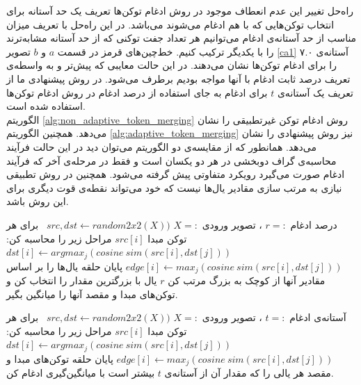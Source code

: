 راه‌حل تغییر این عدم انعطاف موجود در روش ادغام توکن‌ها تعریف یک حد آستانه برای انتخاب توکن‌هایی که با هم ادغام می‌شوند می‌باشد. در این راه‌حل با تعریف میزان مناسب از حد آستانه‌ی ادغام می‌توانیم هر تعداد جفت توکنی که از حد آستانه مشابه‌ترند را با یکدیگر ترکیب کنیم. خط‌چین‌های قرمز در قسمت $a$ و $b$ تصویر \ref{ca1} آستانه‌ی ۷.۰ را برای ادغام توکن‌ها نشان می‌دهند. در این حالت معایبی که پیش‌تر و به واسطه‌ی تعریف درصد ثابت ادغام با آنها مواجه بودیم برطرف می‌شود. در روش پیشنهادی ما از تعریف یک آستانه‌ی $t$ برای ادغام به جای استفاده از درصد ادغام در روش ادغام توکن‌ها استفاده شده است.
\\
الگوریتم \ref{alg:non_adaptive_token_merging} روش ادغام توکن غیرتطبیقی را نشان می‌دهد. همچنین الگوریتم \ref{alg:adaptive_token_merging} نیز روش پیشنهادی را نشان می‌دهد. همانطور که از مقایسه‌ی دو الگوریتم می‌توان دید در این حالت فرآیند محاسبه‌ی گراف دوبخشی در هر دو یکسان است و فقط در مرحله‌ی آخر که فرآیند ادغام صورت می‌گیرد رویکرد متفاوتی پیش گرفته می‌شود. همچنین در روش تطبیقی نیازی به مرتب سازی مقادیر یال‌ها نیست که خود می‌تواند نقطه‌ی قوت دیگری برای این روش باشد.


\begin{algorithm}[H]
	\caption{روش ادغام توکن غیرتطبیقی}
	\label{alg:non_adaptive_token_merging}
	\begin{algorithmic}[1]
		\State درصد ادغام $r =:$ ،  تصویر ورودی $X =:$
		\State $src, dst \gets random2x2(X))$ 
		\State  برای هر توکن مبدا $src[i]$ مراحل زیر را محاسبه کن:
		\State  $dst[i] \gets argmax_j \left( cosine\ sim(src[i], dst[j]) \right)$ 
		\State  $edge[i] \gets max_j \left( cosine\ sim(src[i], dst[j]) \right)$ 
		\State پایان حلقه
		\State یال‌ها را بر اساس مقادیر آنها از کوچک به بزرگ مرتب کن
		\State $r$  یال با بزرگترین مقدار را انتخاب کن و توکن‌های مبدا و مقصد آنها را میانگین بگیر.
	\end{algorithmic}
\end{algorithm}

\begin{algorithm}[H]
	\caption{روش ادغام توکن تطبیقی}
	\label{alg:adaptive_token_merging}
	\begin{algorithmic}[1]
		\State آستانه‌ی ادغام $t =:$ ،  تصویر ورودی $X =:$
		\State $src, dst \gets random2x2(X))$ 
		\State  برای هر توکن مبدا $src[i]$ مراحل زیر را محاسبه کن:
		\State  $dst[i] \gets argmax_j \left( cosine\ sim(src[i], dst[j]) \right)$ 
		\State  $edge[i] \gets max_j \left( cosine\ sim(src[i], dst[j]) \right)$ 
		\State پایان حلقه
		\State توکن‌های مبدا و مقصد هر یالی را که مقدار آن از آستانه‌ی $t$ بیشتر است با میانگین‌گیری ادغام کن.
	\end{algorithmic}
\end{algorithm}


